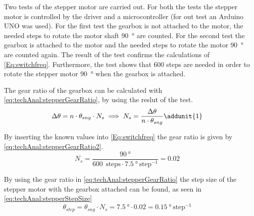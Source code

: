 
Two tests of the stepper motor are carried out. For both the tests the stepper motor is controlled by the driver and a microcontroller (for out test an Arduino UNO was used). For the first test the gearbox is not attached to the motor, the needed steps to rotate the motor shaft \SI{90}{\degree} are counted. For the second test the gearbox is attached to the motor and the needed steps to rotate the motor \SI{90}{\degree} are counted again. The result of the test confirms the calculations of \autoref{Eq:switchfreq}. Furthermore, the test shows that 600 steps are needed in order to rotate the stepper motor \SI{90}{\degree} when the gearbox is attached. 

The gear ratio of the gearbox can be calculated with \autoref{eq:techAnal:stepperGearRatio}, by using the reslut of the test. 
\begin{equation}
\Delta\theta = n \cdot \theta_{sng}
 \cdot N_{s} \implies N_{s}=\frac{\Delta\theta}{n \cdot \theta_{sng}} \addunit{1}\label{eq:techAnal:stepperGearRatio}
\end{equation}
\startexplain
{}
\stopexplain

By inserting the known values into \autoref{Eq:switchfreq} the gear ratio is given by \autoref{eq:techAnal:stepperGearRatio2}.
\begin{equation}
N_{s} = \frac{\SI{90}{\degree}}{\SI{600}{}~\text{steps} \cdot \SI{7.5}{\degree}~\text{step}^{-1}} = 0.02 \label{eq:techAnal:stepperGearRatio2}
\end{equation}

By using the gear ratio in  \autoref{eq:techAnal:stepperGearRatio} the step size of the stepper motor with the gearbox attached can be found, as seen in  \autoref{eq:techAnal:stepperStepSize}
\begin{equation}
\theta_{step} = \theta_{sng} \cdot N_{s} =\SI{7.5}{\degree}\cdot \si{0.02} = \SI{0.15}{\degree}~\text{step}^{-1} \label{eq:techAnal:stepperStepSize}
\end{equation}

